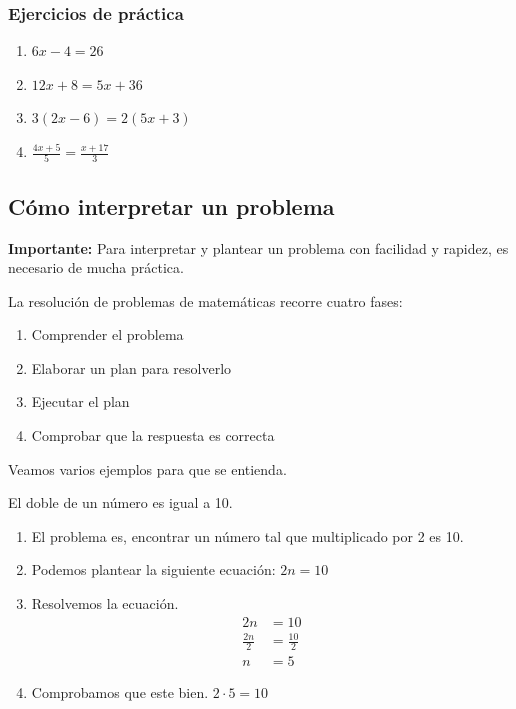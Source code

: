 \documentclass{article}
\begin{document}
\subsubsection*{Ejercicios de práctica}
\begin{normalsize}
\begin{enumerate}
	\item $6x-4=26$
	\item $12x+8=5x+36$
	\item $3(2x-6)=2(5x+3)$
	\item $\frac{4x+5}{5}=\frac{x+17}{3}$
\end{enumerate}
\end{normalsize}

\subsection{Cómo interpretar un problema}
\begin{normalsize}
\textbf{Importante:} Para interpretar y plantear un problema con facilidad y rapidez, es necesario de mucha práctica.

La resolución de problemas de matemáticas recorre cuatro fases:
\begin{enumerate}
	\item Comprender el problema
	\item Elaborar un plan para resolverlo
	\item Ejecutar el plan
	\item Comprobar que la respuesta es correcta
\end{enumerate}

Veamos varios ejemplos para que se entienda.
\\
\end{normalsize}

\begin{ejemplo}
El doble de un número es igual a 10.

\begin{enumerate}
	\item El problema es, encontrar un número tal que multiplicado por 2 es 10.
	\item Podemos plantear la siguiente ecuación: $2n=10$
	\item Resolvemos la ecuación.
		\begin{align}
		2n&=10\nonumber\\
		\frac{2n}{2}&=\frac{10}{2}\nonumber\\
		n&=5\nonumber
		\end{align}
	\item Comprobamos que este bien. $2\cdot5=10$
\end{enumerate}

\end{ejemplo}
\end{document}

